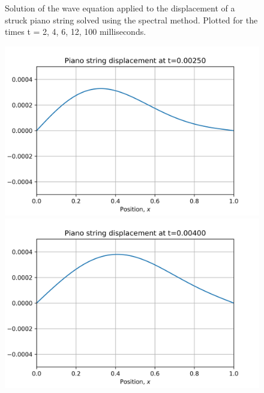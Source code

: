 \documentclass{article}
\begin{document}
\begin{figure}[H]
\begin{minipage}[b]{0.33\linewidth}
  	\end{minipage}
 	\caption{Solution of the wave equation applied to the displacement of a struck piano string solved using the spectral method. Plotted for the times t = 2, 4, 6, 12, 100 milliseconds.} 
\label{fig:wave_FT}
\end{figure}


\begin{figure}[H]  
	\begin{minipage}[b]{0.33\linewidth}
  		\includegraphics[width=1.0\linewidth]{../images/Lab08_t=2ms.png} 
  	\end{minipage} 
  	\begin{minipage}[b]{0.33\linewidth}
    	\includegraphics[width=1.0\linewidth]{../images/Lab08_t=4ms.png} 
  	\end{minipage} 
  	\begin{minipage}[b]{0.33\linewidth}

\end{minipage}
\end{figure}
\end{document}
